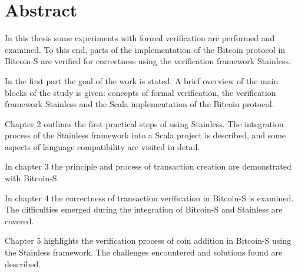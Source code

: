 \chapter*{Abstract}
\label{chap:abstract}


In this thesis some experiments with formal verification are performed and examined. 
To this end, parts of the implementation of the Bitcoin protocol in Bitcoin-S are verified for correctness using the verification framework Stainless.

In the first part the goal of the work is stated. 
A brief overview of the main blocks of the study is given: concepts of formal verification, the verification framework Stainless and the Scala implementation of the Bitcoin protocol.

Chapter 2 outlines the first practical steps of using Stainless. 
The integration process of the Stainless framework into a Scala project is described, and some aspects of language compatibility are visited in detail.

In chapter 3 the principle and process of transaction creation are demonstrated with Bitcoin-S.

In chapter 4 the correctness of transaction verification in Bitcoin-S is examined. 
The difficulties emerged during the integration of Bitcoin-S and Stainless are covered.

Chapter 5 highlights the verification process of coin addition in Bitcoin-S using the Stainless framework.
The challenges encountered and solutions found are described.